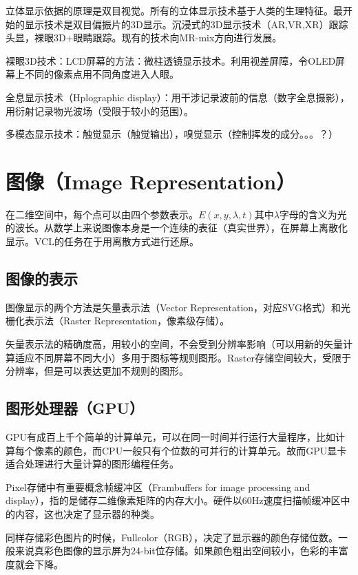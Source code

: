 \documentclass{ctexart}
\theoremstyle{cnthm}
\begin{document}
立体显示依据的原理是双目视觉。所有的立体显示技术基于人类的生理特征。最开始的显示技术是双目偏振片的3D显示。沉浸式的3D显示技术（AR,VR,XR）跟踪头显，裸眼3D+眼睛跟踪。现有的技术向MR-mix方向进行发展。

裸眼3D技术：LCD屏幕的方法：微柱透镜显示技术。利用视差屏障，令OLED屏幕上不同的像素点用不同角度进入人眼。

全息显示技术（Hplographic display）：用干涉记录波前的信息（数字全息摄影），用衍射记录物光波场（受限于较小的范围）。

多模态显示技术：触觉显示（触觉输出），嗅觉显示（控制挥发的成分。。。？）

\section{图像（Image Representation）}

在二维空间中，每个点可以由四个参数表示。$E(x,y,\lambda,t)$其中$\lambda$字母的含义为光的波长。从数学上来说图像本身是一个连续的表征（真实世界），在屏幕上离散化显示。VCL的任务在于用离散方式进行还原。

\subsection{图像的表示}

图像显示的两个方法是矢量表示法（Vector Representation，对应SVG格式）和光栅化表示法（Raster Representation，像素级存储）。

矢量表示法的精确度高，用较小的空间，不会受到分辨率影响（可以用新的矢量计算适应不同屏幕不同大小）多用于图标等规则图形。Raster存储空间较大，受限于分辨率，但是可以表达更加不规则的图形。

\subsection{图形处理器（GPU）}

GPU有成百上千个简单的计算单元，可以在同一时间并行运行大量程序，比如计算每个像素的颜色，而CPU一般只有个位数的可并行的计算单元。故而GPU显卡适合处理进行大量计算的图形编程任务。

Pixel存储中有重要概念帧缓冲区（Frambuffers for image processing and display），指的是储存二维像素矩阵的内存大小。硬件以60Hz速度扫描帧缓冲区中的内容，这也决定了显示器的种类。

同样存储彩色图片的时候，Fullcolor（RGB），决定了显示器的颜色存储位数。一般来说真彩色图像的显示屏为24-bit位存储。如果颜色粗出空间较小，色彩的丰富度就会下降。
\end{document}
